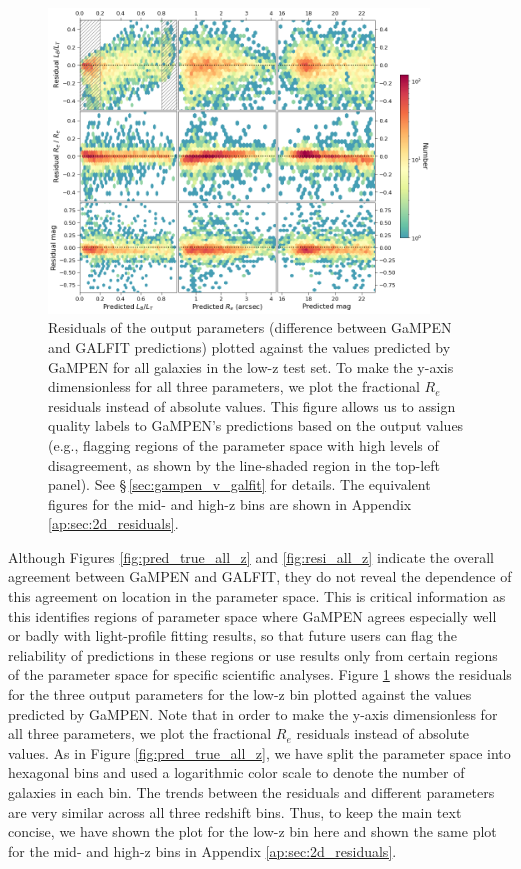 \documentclass[linenumbers,twocolumn,twocolappendix]{aastex631}
\newcommand\gampen{GaMPEN}
\begin{document}
\begin{CJK*}{UTF8}{gbsn}
\begin{figure}[htb]
    \centering
    \includegraphics[width = 0.9\textwidth]{2d_res_low_z.png}
    \caption{Residuals of the output parameters (difference between \gampen{} and GALFIT predictions) plotted against the values predicted by \gampen{} for all galaxies in the low-z test set. To make the y-axis dimensionless for all three parameters, we plot the fractional $R_e$ residuals instead of absolute values. This figure allows us to assign quality labels to \gampen{}'s predictions based on the output values (e.g., flagging regions of the parameter space with high levels of disagreement, as shown by the line-shaded region in the top-left panel). See \S\,\ref{sec:gampen_v_galfit} for details. The equivalent figures for the mid- and high-z bins are shown in Appendix \ref{ap:sec:2d_residuals}.}
    \label{fig:2d_res_low_z}
\end{figure}

Although Figures \ref{fig:pred_true_all_z} and \ref{fig:resi_all_z} indicate the overall agreement between \gampen{} and GALFIT, they do not reveal the dependence of this agreement on location in the parameter space. This is critical information as this identifies regions of parameter space where \gampen{} agrees especially well or badly with light-profile fitting results, so that future users can flag the reliability of predictions in these regions or use results only from certain regions of the parameter space for specific scientific analyses. Figure \ref{fig:2d_res_low_z} shows the residuals for the three output parameters for the low-z bin plotted against the values predicted by \gampen{}. Note that in order to make the y-axis dimensionless for all three parameters, we plot the fractional $R_e$ residuals instead of absolute values. As in Figure \ref{fig:pred_true_all_z},  we have split the parameter space into hexagonal bins and used a logarithmic color scale to denote the number of galaxies in each bin. The trends between the residuals and different parameters are very similar across all three redshift bins. Thus, to keep the main text concise, we have shown the plot for the low-z bin here and shown the same plot for the mid- and high-z bins in Appendix \ref{ap:sec:2d_residuals}.


\end{CJK*}
\end{document}
